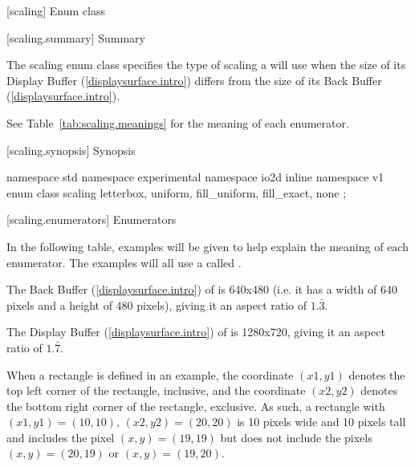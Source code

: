  [scaling] {Enum class }

 [scaling.summary] { Summary}

\pnum
The scaling enum class specifies the type of scaling a  
will use when the size of its Display Buffer (\ref{displaysurface.intro}) differs from the size of its Back Buffer (\ref{displaysurface.intro}).

\pnum
See Table~\ref{tab:scaling.meanings} for the meaning of each  enumerator.

 [scaling.synopsis] { Synopsis}

\begin{codeblock}
namespace std { namespace experimental { namespace io2d { inline namespace v1 {
  enum class scaling {
    letterbox,
    uniform,
    fill_uniform,
    fill_exact,
    none
  };
} } } }
\end{codeblock}

 [scaling.enumerators] { Enumerators}

\pnum
\begin{note}
In the following table, examples will be given to help explain the meaning of each enumerator. The examples will all use a  called .

The Back Buffer (\ref{displaysurface.intro}) of  is 640x480 (i.e. it has a width of 640 pixels and a height of 480 pixels), giving it an aspect ratio of $1.\bar{3}$.

The Display Buffer (\ref{displaysurface.intro}) of  is 1280x720, giving it an aspect ratio of $1.\bar{7}$.

When a rectangle is defined in an example, the coordinate $(x1,y1)$ denotes the top left corner of the rectangle, inclusive, and the coordinate $(x2,y2)$ denotes the bottom right corner of the rectangle, exclusive. As such, a rectangle with $(x1,y1) = (10,10)$, $(x2,y2) = (20, 20)$ is 10 pixels wide and 10 pixels tall and includes the pixel $(x,y) = (19,19)$ but does not include the pixels $(x,y) = (20,19)$ or $(x,y) = (19,20)$.
\end{note}

